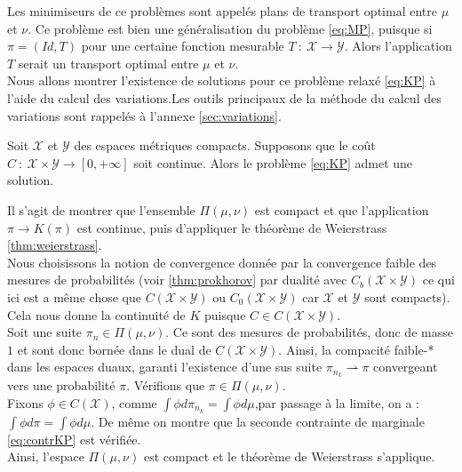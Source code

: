 \documentclass[a4paper,12pt]{article}
\begin{document}
Les minimiseurs de ce problèmes sont appelés plans de transport optimal entre $\mu$ et $\nu$. Ce problème est bien une généralisation du problème \eqref{eq:MP}, puisque si $\pi = (Id,T)$ pour une certaine fonction mesurable $T\ :\ \mathcal{X}\rightarrow\mathcal{Y}$. Alors l'application $T$ serait un transport optimal entre $\mu$ et $\nu$. \\

Nous allons montrer l'existence de solutions pour ce problème relaxé \eqref{eq:KP} à l'aide du calcul des variations.Les outils principaux de la méthode du calcul des variations sont rappelés à l'annexe \ref{sec:variations}. 
\begin{theoreme}{}
Soit $\mathcal{X}$ et $\mathcal{Y}$ des espaces métriques compacts. Supposons que le coût $C\ :\ \mathcal{X}\times\mathcal{Y}\rightarrow [0,+\infty]$ soit continue. Alors le problème \eqref{eq:KP} admet une solution.
\end{theoreme}
\begin{preuve}
Il s'agit de montrer que l'ensemble $\Pi (\mu,\nu)$ est compact et que l'application $\pi\rightarrow K(\pi )$ est continue, puis d'appliquer le théorème de Weierstrass \eqref{thm:weierstrass}. \\
Nous choisissons la notion de convergence donnée par la convergence faible des mesures de probabilités (voir \eqref{thm:prokhorov} par dualité avec $C_b(\mathcal{X}\times\mathcal{Y})$ ce qui ici est a même chose que $C(\mathcal{X}\times\mathcal{Y})$ ou $C_0(\mathcal{X}\times\mathcal{Y})$ car $\mathcal{X}$ et $\mathcal{Y}$ sont compacts). Cela nous donne la continuité de $K$ puisque $C\in C(\mathcal{X}\times\mathcal{Y})$. \\

Soit une suite $\pi_n\in\Pi (\mu,\nu )$. Ce sont des mesures de probabilités, donc de masse $1$ et sont donc bornée dans le dual de $C(\mathcal{X}\times\mathcal{Y})$. Ainsi, la compacité faible-* dans les espaces duaux, garanti l'existence d'une sus suite $\pi_{n_k} \rightharpoonup \pi$ convergeant vers une probabilité $\pi$. 
Vérifions que $\pi \in \Pi (\mu,\nu )$. \\
Fixons $\phi\in C(\mathcal{X})$, comme $\int\phi d\pi_{n_k} =\int \phi d\mu $,par passage à la limite, on a : $\int\phi d\pi =\int\phi d\mu$. De même on montre que la seconde contrainte de marginale \eqref{eq:contrKP} est vérifiée. \\
Ainsi, l'espace $\Pi(\mu,\nu)$ est compact et le théorème de Weierstrass s'applique.
\end{preuve}
\end{document}
